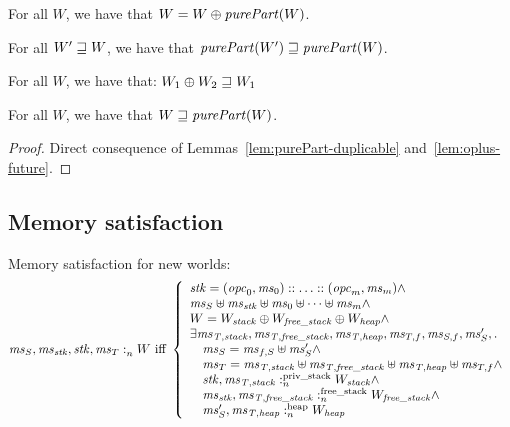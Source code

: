 \documentclass[a4paper]{article}
\begin{document}
\begin{lemma}
  \label{lem:purePart-duplicable}
 For all $W$, we have that $W = W \oplus \purePart{W}$.
\end{lemma}

\begin{lemma}
  \label{lem:purePart-mono}
 For all $W'\sqsupseteq W$, we have that $\purePart{W'} \future \purePart{W}$.
\end{lemma}

\begin{lemma}
  \label{lem:oplus-future}
  For all $W$, we have that:
  $W_1 \oplus W_2 \sqsupseteq W_1$
\end{lemma}

\begin{lemma}
  \label{lem:world-fut-purePart}
  For all $W$, we have that $W \future \purePart{W}$.
\end{lemma}
\begin{proof}
  Direct consequence of Lemmas~\ref{lem:purePart-duplicable}
  and~\ref{lem:oplus-future}.
\end{proof}

\subsection{Memory satisfaction}
Memory satisfaction for new worlds:
\[
  \mathit{ms}_S,\mathit{ms}_{\mathit{stk}},\mathit{stk},\mathit{ms}_T :_{n}^{}W \text{ iff } 
  \left\{
    \begin{array}{l}
      \mathit{stk} = (\mathit{opc}_0,\mathit{ms}_0):: \dots :: (\mathit{opc}_m,\mathit{ms}_m) \wedge \\
      \mathit{ms}_S \uplus \mathit{ms}_{\mathit{stk}} \uplus \mathit{ms}_0 \uplus \dots \uplus \mathit{ms}_m  \wedge\\
      W = W_{\mathit{stack}} \oplus W_{\mathit{free\_stack}} \oplus W_{\mathit{heap}} \wedge\\
      \exists \mathit{ms}_{\mathit{T,stack}}, \mathit{ms}_{\mathit{T,free\_stack}}, \mathit{ms}_{\mathit{T,heap}}, \mathit{ms}_{T,f}, \mathit{ms}_{S,f}, \mathit{ms}_S',\ldotp \\
      \quad \mathit{ms}_S = \mathit{ms}_{f,S} \uplus \mathit{ms}_S' \wedge \\
      \quad \mathit{ms}_T = \mathit{ms}_{\mathit{T,stack}} \uplus \mathit{ms}_{\mathit{T,free\_stack}} \uplus \mathit{ms}_{\mathit{T,heap}} \uplus \mathit{ms}_{T,f} \wedge \\

      \quad \mathit{stk},\mathit{ms}_{\mathit{T,stack}} :_{n}^{\text{priv\_stack}}W_{\mathit{stack}} \wedge \\
      \quad \mathit{ms}_{\mathit{stk}},\mathit{ms}_{\mathit{T,free\_stack}} :_{n}^{\text{free\_stack}}W_{\mathit{free\_stack}} \wedge \\
      \quad \mathit{ms}_S',\mathit{ms}_{\mathit{T,heap}} :_{n}^{\text{heap}}W_{\mathit{heap}}
    \end{array}
  \right.
\]
\end{document}

